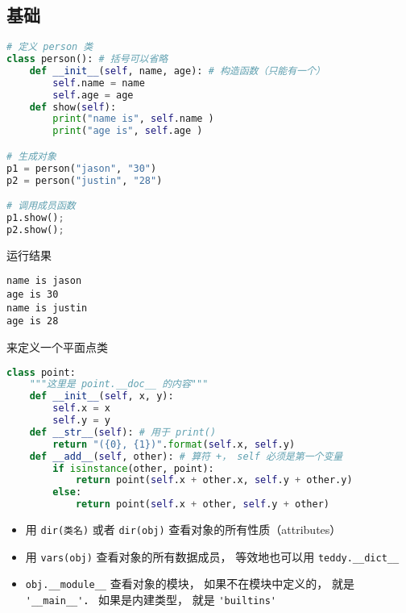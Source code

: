 
\begin{issues}
\issueDraft
\end{issues}


\subsection{基础}
\begin{lstlisting}[language=python]
# 定义 person 类
class person(): # 括号可以省略
    def __init__(self, name, age): # 构造函数（只能有一个）
        self.name = name 
        self.age = age 
    def show(self): 
        print("name is", self.name ) 
        print("age is", self.age ) 

# 生成对象
p1 = person("jason", "30") 
p2 = person("justin", "28")

# 调用成员函数
p1.show();
p2.show();
\end{lstlisting}
运行结果
\begin{lstlisting}
name is jason
age is 30
name is justin
age is 28
\end{lstlisting}

来定义一个平面点类
\begin{lstlisting}[language=python]
class point:
    """这里是 point.__doc__ 的内容"""
    def __init__(self, x, y): 
        self.x = x 
        self.y = y 
    def __str__(self): # 用于 print()
        return "({0}, {1})".format(self.x, self.y)
    def __add__(self, other): # 算符 +， self 必须是第一个变量
        if isinstance(other, point):
            return point(self.x + other.x, self.y + other.y)
        else:
            return point(self.x + other, self.y + other)
\end{lstlisting}
\begin{itemize}
\item 用 \verb|dir(类名)| 或者 \verb|dir(obj)| 查看对象的所有性质（attributes）
\item 用 \verb|vars(obj)| 查看对象的所有数据成员， 等效地也可以用 \verb|teddy.__dict__|
\item \verb|obj.__module__| 查看对象的模块， 如果不在模块中定义的， 就是 \verb|'__main__'|． 如果是内建类型， 就是 \verb|'builtins'|
\end{itemize}

